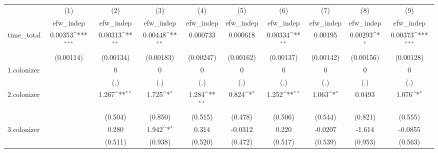 {
\def\sym#1{\ifmmode^{#1}\else\(^{#1}\)\fi}
\begin{tabular}{l*{9}{c}}
\hline\hline
            &\multicolumn{1}{c}{(1)}&\multicolumn{1}{c}{(2)}&\multicolumn{1}{c}{(3)}&\multicolumn{1}{c}{(4)}&\multicolumn{1}{c}{(5)}&\multicolumn{1}{c}{(6)}&\multicolumn{1}{c}{(7)}&\multicolumn{1}{c}{(8)}&\multicolumn{1}{c}{(9)}\\
            &\multicolumn{1}{c}{efw\_indep}&\multicolumn{1}{c}{efw\_indep}&\multicolumn{1}{c}{efw\_indep}&\multicolumn{1}{c}{efw\_indep}&\multicolumn{1}{c}{efw\_indep}&\multicolumn{1}{c}{efw\_indep}&\multicolumn{1}{c}{efw\_indep}&\multicolumn{1}{c}{efw\_indep}&\multicolumn{1}{c}{efw\_indep}\\
\hline
time\_total  &     0.00353\sym{***}&     0.00313\sym{**} &     0.00448\sym{**} &    0.000733         &    0.000618         &     0.00334\sym{**} &     0.00195         &     0.00293\sym{*}  &     0.00373\sym{***}\\
            &   (0.00114)         &   (0.00134)         &   (0.00183)         &   (0.00247)         &   (0.00162)         &   (0.00137)         &   (0.00142)         &   (0.00156)         &   (0.00128)         \\
[1em]
1.colonizer &                     &           0         &           0         &           0         &           0         &           0         &           0         &           0         &           0         \\
            &                     &         (.)         &         (.)         &         (.)         &         (.)         &         (.)         &         (.)         &         (.)         &         (.)         \\
[1em]
2.colonizer &                     &       1.267\sym{**} &       1.725\sym{*}  &       1.284\sym{**} &       0.824\sym{*}  &       1.252\sym{**} &       1.063\sym{*}  &      0.0493         &       1.076\sym{*}  \\
            &                     &     (0.504)         &     (0.850)         &     (0.515)         &     (0.478)         &     (0.506)         &     (0.544)         &     (0.821)         &     (0.555)         \\
[1em]
3.colonizer &                     &       0.280         &       1.942\sym{*}  &       0.314         &     -0.0312         &       0.220         &     -0.0207         &      -1.614         &     -0.0855         \\
            &                     &     (0.511)         &     (0.938)         &     (0.520)         &     (0.472)         &     (0.517)         &     (0.539)         &     (0.953)         &     (0.563)         \\

\end{tabular}}
